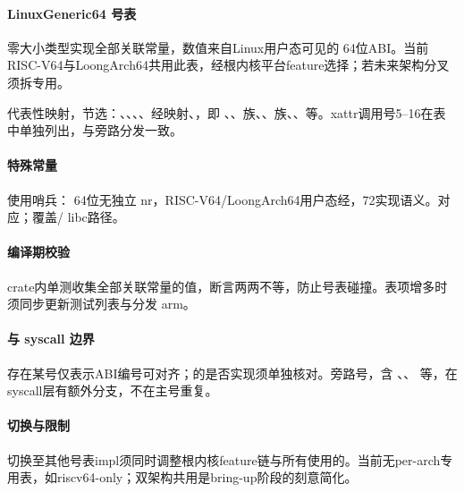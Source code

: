 
\paragraph{LinuxGeneric64 号表}

零大小类型实现全部关联常量，数值来自Linux用户态可见的 64位ABI。当前RISC-V64与LoongArch64共用此表，经根内核平台feature选择；若未来架构分叉须拆专用。

代表性映射，节选：、、、、经映射、，即 、、族、、族、、等。xattr调用号5--16在表中单独列出，与旁路分发一致。

\paragraph{特殊常量}

使用哨兵： 64位无独立 nr，RISC-V64/LoongArch64用户态经，72实现语义。对应；覆盖/ libc路径。

\paragraph{编译期校验}

crate内单测收集全部关联常量的值，断言两两不等，防止号表碰撞。表项增多时须同步更新测试列表与分发 arm。

\paragraph{与 syscall 边界}

存在某号仅表示ABI编号可对齐；的是否实现须单独核对。旁路号，含 、、 等，在syscall层有额外分支，不在主号重复。

\paragraph{切换与限制}

切换至其他号表impl须同时调整根内核feature链与所有使用的。当前无per-arch专用表，如riscv64-only；双架构共用是bring-up阶段的刻意简化。
